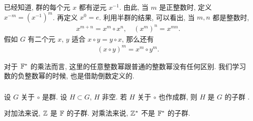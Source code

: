\begin{definition}
    已经知道, 群的每个元 $x$ 都有逆元 $x^{-1}$. 由此, 当 $m$ 是正整数时, 定义 $x^{-m} = (x^{-1})^m$. 再定义 $x^0 = e$. 利用半群的结果, 可以看出, 当 $m,n$ 都是整数时,
    \begin{align*}
        x^{m+n} = x^m \circ x^n, \quad (x^m)^n = x^{mn}.
    \end{align*}
    假如 $G$ 有二个元 $x$, $y$ 适合 $x \circ y = y \circ x$, 那么还有
    \begin{align*}
        (x \circ y)^m = x^m \circ y^m.
    \end{align*}
\end{definition}

\begin{example}
    对于 $\mathbb{F}^{\ast}$ 的乘法而言, 这里的任意整数幂跟普通的整数幂没有任何区别. 我们学习数的负整数幂的时候, 也是借助倒数定义的.
\end{example}

\subsubsection*{\Subgroups}

\begin{definition}
    设 $G$ 关于 $\circ$ 是群. 设 $H \subset G$, $H$ 非空. 若 $H$ 关于 $\circ$ 也作成群, 则 $H$ 是 $G$ 的子群 .
\end{definition}

\begin{example}
    对加法来说, $\mathbb{Z}$ 是 $\mathbb{F}$ 的子群. 对乘法来说, $\mathbb{Z}^{\ast}$ 不是 $\mathbb{F}^{\ast}$ 的子群.
\end{example}

